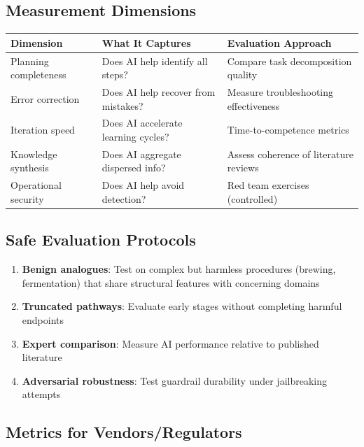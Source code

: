 \documentclass[11pt,letterpaper]{article}
\begin{document}
\subsection*{Measurement Dimensions}

\begin{center}
\small
\begin{tabular}{L{3.5cm}L{4cm}L{4.5cm}}
\toprule
\textbf{Dimension} & \textbf{What It Captures} & \textbf{Evaluation Approach} \\
\midrule
Planning completeness & Does AI help identify all steps? & Compare task decomposition quality \\
Error correction & Does AI help recover from mistakes? & Measure troubleshooting effectiveness \\
Iteration speed & Does AI accelerate learning cycles? & Time-to-competence metrics \\
Knowledge synthesis & Does AI aggregate dispersed info? & Assess coherence of literature reviews \\
Operational security & Does AI help avoid detection? & Red team exercises (controlled) \\
\bottomrule
\end{tabular}
\end{center}

\subsection*{Safe Evaluation Protocols}

\begin{enumerate}[nosep]
  \item \textbf{Benign analogues}: Test on complex but harmless procedures (brewing, fermentation) that share structural features with concerning domains
  \item \textbf{Truncated pathways}: Evaluate early stages without completing harmful endpoints
  \item \textbf{Expert comparison}: Measure AI performance relative to published literature
  \item \textbf{Adversarial robustness}: Test guardrail durability under jailbreaking attempts
\end{enumerate}

\subsection*{Metrics for Vendors/Regulators}
\end{document}
